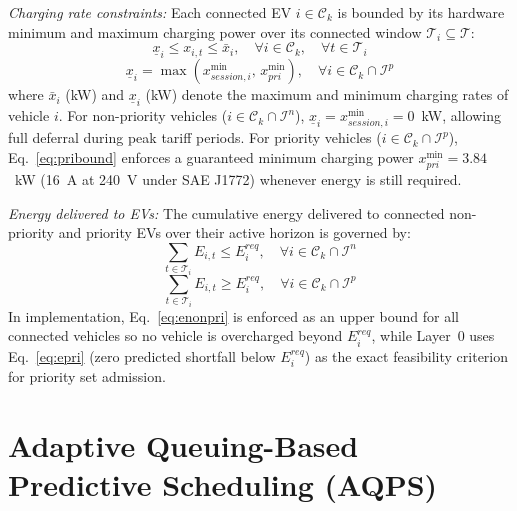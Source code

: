 \documentclass[final,3p,times,twocolumn]{elsarticle}
\begin{document}
\textit{Charging rate constraints:} Each connected EV $i \in \mathcal{C}_k$ is bounded by its hardware minimum and maximum charging power over its connected window $\mathcal{T}_i \subseteq \mathcal{T}$:
\begin{equation}
    \underline{x}_i \le x_{i,t} \le \bar{x}_i, \quad \forall i \in \mathcal{C}_k, \quad \forall t \in \mathcal{T}_i
    \label{eq:ratebounds}
\end{equation}
\begin{equation}
    \underline{x}_i = \max(x_{session,i}^{\min}, \, x_{pri}^{\min}), \quad \forall i \in \mathcal{C}_k \cap \mathcal{I}^p
    \label{eq:pribound}
\end{equation}
where $\bar{x}_i$ (kW) and $\underline{x}_i$ (kW) denote the maximum and minimum charging rates of vehicle $i$. For non-priority vehicles ($i \in \mathcal{C}_k \cap \mathcal{I}^n$), $\underline{x}_i = x_{session,i}^{\min} = 0$~kW, allowing full deferral during peak tariff periods. For priority vehicles ($i \in \mathcal{C}_k \cap \mathcal{I}^p$), Eq.~\eqref{eq:pribound} enforces a guaranteed minimum charging power $x_{pri}^{\min} = 3.84$~kW (16~A at 240~V under SAE J1772) whenever energy is still required.

\textit{Energy delivered to EVs:} The cumulative energy delivered to connected non-priority and priority EVs over their active horizon is governed by:
\begin{equation}
    \sum_{t \in \mathcal{T}_i} E_{i,t} \le E_i^{req}, \quad \forall i \in \mathcal{C}_k \cap \mathcal{I}^n
    \label{eq:enonpri}
\end{equation}
\begin{equation}
    \sum_{t \in \mathcal{T}_i} E_{i,t} \ge E_i^{req}, \quad \forall i \in \mathcal{C}_k \cap \mathcal{I}^p
    \label{eq:epri}
\end{equation}
In implementation, Eq.~\eqref{eq:enonpri} is enforced as an upper bound for all connected vehicles so no vehicle is overcharged beyond $E_i^{req}$, while Layer~0 uses Eq.~\eqref{eq:epri} (zero predicted shortfall below $E_i^{req}$) as the exact feasibility criterion for priority set admission.

\section{Adaptive Queuing-Based Predictive Scheduling (AQPS)}
\label{sec:aqps}
\end{document}
